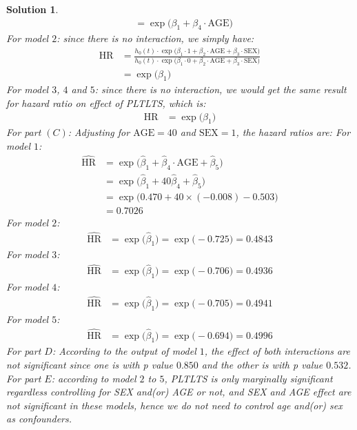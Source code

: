 \documentclass[11pt]{article}
\newtheorem{sol}{Solution}
\begin{document}
\begin{sol}
\begin{align*}
		&= \exp\Big(\beta_1+ \beta_4\cdot \text{AGE}\Big)
	\end{align*}
	For model $2$:\vskip 2mm
	since there is no interaction, we simply have:
	\begin{align*}
		\text{HR} &= \frac{h_0(t)\cdot \exp\Big(\beta_1\cdot 1 + \beta_2\cdot \text{AGE} + \beta_3\cdot \text{SEX}\Big)}{h_0(t)\cdot\exp\Big(\beta_1\cdot 0 + \beta_2\cdot \text{AGE} + \beta_3\cdot \text{SEX}\Big)}\\
		&= \exp\Big(\beta_1\Big)
	\end{align*}
	For model $3$, $4$ and $5$:\vskip 2mm
	since there is no interaction, we would get the same result for hazard ratio on effect of PLTLTS, which is:
	\begin{align*}
		\text{HR} &= \exp\Big(\beta_1\Big)
	\end{align*}
	For part $(C)$:\vskip 2mm
	Adjusting for $\text{AGE} = 40$ and $\text{SEX} = 1$, the hazard ratios are:\vskip 2mm
	For model $1$:
	\begin{align*}
		\hat{\text{HR}} &= \exp\Big(\hat{\beta}_1 + \hat{\beta}_4\cdot \text{AGE} + \hat{\beta}_5\Big)\\
		&= \exp\Big(\hat{\beta}_1 + 40\hat{\beta}_4 + \hat{\beta}_5\Big)\\
		&= \exp\Big(0.470 + 40\times (-0.008) -0.503\Big)\\
		&= 0.7026
	\end{align*}
	For model $2$:
	\begin{align*}
		\hat{\text{HR}} &= \exp\Big(\hat{\beta}_1\Big) = \exp\Big(-0.725\Big) = 0.4843
	\end{align*}
	For model $3$:
	\begin{align*}
		\hat{\text{HR}} &= \exp\Big(\hat{\beta}_1\Big) = \exp\Big(-0.706\Big) =0.4936
	\end{align*}
	For model $4$:
	\begin{align*}
		\hat{\text{HR}} &= \exp\Big(\hat{\beta}_1\Big) = \exp\Big(-0.705\Big) = 0.4941
	\end{align*}
	For model $5$:
	\begin{align*}
		\hat{\text{HR}} &= \exp\Big(\hat{\beta}_1\Big) = \exp\Big(-0.694\Big) = 0.4996
	\end{align*}
	For part $D$:\vskip 2mm
	According to the output of model $1$, the effect of both interactions are not significant since one is with p value $0.850$ and the other is with p value $0.532$.\vskip 2mm
	For part $E$:\vskip 2mm
	according to model $2$ to $5$, PLTLTS is only marginally significant regardless controlling for SEX and(or) AGE or not, and SEX and AGE effect are not significant in these models, hence we do not need to control age and(or) sex as confounders.\vskip 2mm

\end{sol}
\end{document}
